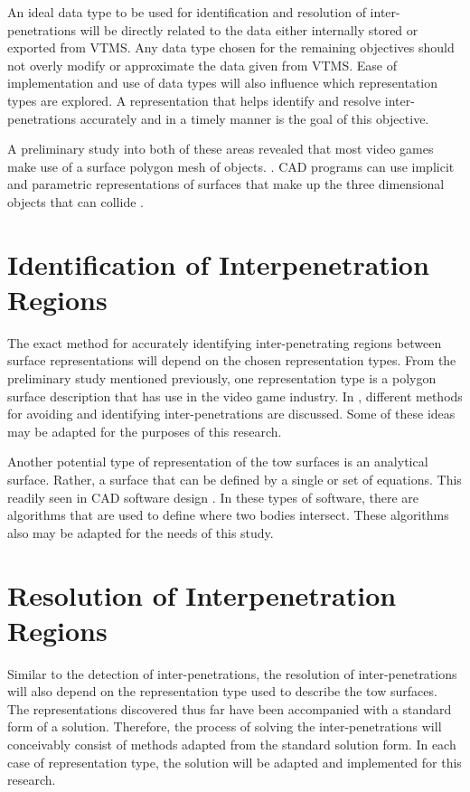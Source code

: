 An ideal data type to be used for identification and resolution of inter-penetrations will be directly related to the data either internally stored or exported from VTMS. Any data type chosen for the remaining objectives should not overly modify or approximate the data given from VTMS. Ease of implementation and use of data types will also influence which representation types are explored. A representation that helps identify and resolve inter-penetrations accurately and in a timely manner is the goal of this objective.

A preliminary study into both of these areas revealed that most video games make use of a surface polygon mesh of objects. \cite{Bobic,Souto}. CAD programs can use implicit and parametric representations of surfaces that make up the three dimensional objects that can collide \cite{CAD}.

\section{Identification of Interpenetration Regions}

The exact method for accurately identifying inter-penetrating regions between surface representations will depend on the chosen representation types. From the preliminary study mentioned previously, one representation type is a polygon surface description that has use in the video game industry. In \cite{Bobic, Souto}, different methods for avoiding and identifying inter-penetrations are discussed. Some of these ideas may be adapted for the purposes of this research.

Another potential type of representation of the tow surfaces is an analytical surface. Rather, a surface that can be defined by a single or set of equations. This readily seen in CAD software design \cite{CAD}. In these types of software, there are algorithms that are used to define where two bodies intersect. These algorithms also may be adapted for the needs of this study.

\section{Resolution of Interpenetration Regions}

Similar to the detection of inter-penetrations, the resolution of inter-penetrations will also depend on the representation type used to describe the tow surfaces. The representations discovered thus far have been accompanied with a standard form of a solution. Therefore, the process of solving the inter-penetrations will conceivably consist of methods adapted from the standard solution form. In each case of representation type, the solution will be adapted and implemented for this research.